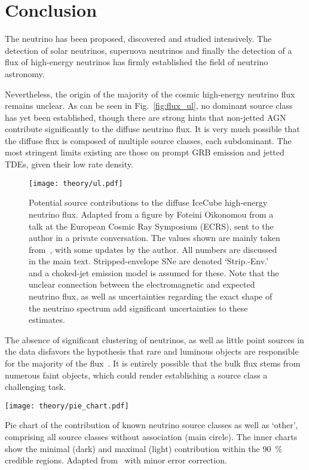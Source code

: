 \section{Conclusion}
The neutrino has been proposed, discovered and studied intensively. The detection of solar neutrinos, supernova neutrinos and finally the detection of a flux of high-energy neutrinos has firmly established the field of neutrino astronomy.

Nevertheless, the origin of the majority of the cosmic high-energy neutrino flux remains unclear. As can be seen in Fig.~\ref{fig:flux_ul}, no dominant source class has yet been established, though there are strong hints that non-jetted AGN contribute significantly to the diffuse neutrino flux. It is very much possible that the diffuse flux is composed of multiple source classes, each subdominant. The most stringent limits existing are those on prompt GRB emission and jetted TDEs, given their low rate density.

\begin{figure}[htb]
    \texttt{[image: theory/ul.pdf]}
    \caption[Contribution to HE neutrino flux]{Potential source contributions to the diffuse IceCube high-energy neutrino flux. Adapted from a figure by Foteini Oikonomou from a talk at the  European Cosmic Ray Symposium (ECRS), sent to the author in a private conversation. The values shown are mainly taken from~\cite{Guepin2022}, with some updates by the author. All numbers are discussed in the main text. Stripped-envelope SNe are denoted `Strip.-Env.' and a choked-jet emission model is assumed for these. Note that the unclear connection between the electromagnetic and expected neutrino flux, as well as uncertainties regarding the exact shape of the neutrino spectrum add significant uncertainties to these estimates.}
\end{figure}

The absence of significant clustering of neutrinos, as well as little point sources in the data disfavors the hypothesis that rare and luminous objects are responsible for the majority of the flux~. It is entirely possible that the bulk flux stems from numerous faint objects, which could render establishing a source class a challenging task.

\begin{marginfigure}
    \texttt{[image: theory/pie\_chart.pdf]}
    \caption[Neutrino flux contribution pie chart]{Pie chart of the contribution of known neutrino source classes as well as `other', comprising all source classes without association (main circle). The inner charts show the minimal (dark) and maximal (light) contribution within the \SI{90}{\percent} credible regions. Adapted from~\cite{Bartos2021} with minor error correction.}
\end{marginfigure}

